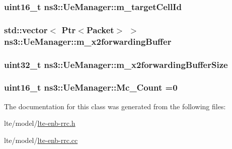 \subsubsection[{\texorpdfstring{m\+\_\+target\+Cell\+Id}{m_targetCellId}}]{\setlength{\rightskip}{0pt plus 5cm}uint16\+\_\+t ns3\+::\+Ue\+Manager\+::m\+\_\+target\+Cell\+Id\hspace{0.3cm}{\ttfamily [private]}}\hypertarget{classns3_1_1UeManager_a8a70641b8dfb0641e6cfcf4cc83083a3}{}\label{classns3_1_1UeManager_a8a70641b8dfb0641e6cfcf4cc83083a3}
\subsubsection[{\texorpdfstring{m\+\_\+x2forwarding\+Buffer}{m_x2forwardingBuffer}}]{\setlength{\rightskip}{0pt plus 5cm}std\+::vector$<$ {\bf Ptr}$<${\bf Packet}$>$ $>$ ns3\+::\+Ue\+Manager\+::m\+\_\+x2forwarding\+Buffer\hspace{0.3cm}{\ttfamily [private]}}\hypertarget{classns3_1_1UeManager_a3fb8a9dc6ef434306f90f42837f3ae83}{}\label{classns3_1_1UeManager_a3fb8a9dc6ef434306f90f42837f3ae83}
\subsubsection[{\texorpdfstring{m\+\_\+x2forwarding\+Buffer\+Size}{m_x2forwardingBufferSize}}]{\setlength{\rightskip}{0pt plus 5cm}uint32\+\_\+t ns3\+::\+Ue\+Manager\+::m\+\_\+x2forwarding\+Buffer\+Size\hspace{0.3cm}{\ttfamily [private]}}\hypertarget{classns3_1_1UeManager_af9b888fa844a79c14b46c50ebae65031}{}\label{classns3_1_1UeManager_af9b888fa844a79c14b46c50ebae65031}
\subsubsection[{\texorpdfstring{Mc\+\_\+\+Count}{Mc_Count}}]{\setlength{\rightskip}{0pt plus 5cm}uint16\+\_\+t ns3\+::\+Ue\+Manager\+::\+Mc\+\_\+\+Count =0\hspace{0.3cm}{\ttfamily [private]}}\hypertarget{classns3_1_1UeManager_a511c8f672390b1520ba134623782ac81}{}\label{classns3_1_1UeManager_a511c8f672390b1520ba134623782ac81}


The documentation for this class was generated from the following files\+:\begin{DoxyCompactItemize}
\item 
lte/model/\hyperlink{lte-enb-rrc_8h}{lte-\/enb-\/rrc.\+h}\item 
lte/model/\hyperlink{lte-enb-rrc_8cc}{lte-\/enb-\/rrc.\+cc}\end{DoxyCompactItemize}
